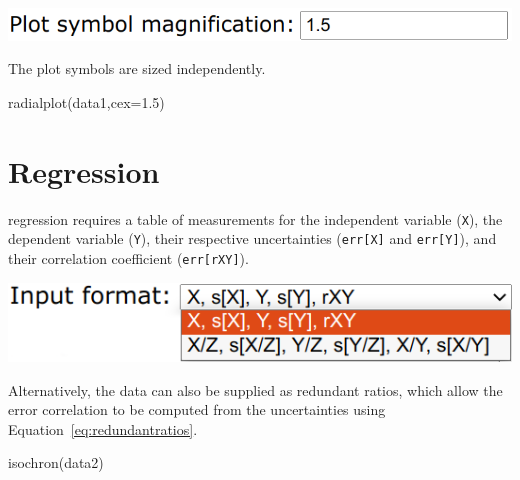 \begin{refsection}
\begin{enumerate}
\noindent\begin{minipage}[t]{.5\linewidth}
\strut\vspace*{-\baselineskip}\newline
\includegraphics[width=\linewidth]{../figures/OtherRadialPCHcex.png}
\end{minipage}
\begin{minipage}[t]{.5\linewidth}
The plot symbols are sized independently.
\end{minipage}

\begin{console}
radialplot(data1,cex=1.5)
\end{console}

\end{enumerate}

\section{Regression}\label{sec:OtherRegression}

\citet{york2004} regression requires a table of measurements for the
independent variable (\texttt{X}), the dependent variable
(\texttt{Y}), their respective uncertainties (\texttt{err[X]} and
\texttt{err[Y]}), and their correlation coefficient
(\texttt{err[rXY]}).\\

\noindent\begin{minipage}[t]{.45\linewidth}
  \strut\vspace*{-\baselineskip}\newline
  \includegraphics[width=\linewidth]{../figures/OtherRegressionInput.png}
\end{minipage}
\begin{minipage}[t]{.55\linewidth}
  Alternatively, the data can also be supplied as redundant ratios,
  which allow the error correlation to be computed from the
  uncertainties using Equation~\ref{eq:redundantratios}.
\end{minipage}

\begin{console}
isochron(data2)
\end{console}


\end{refsection}
